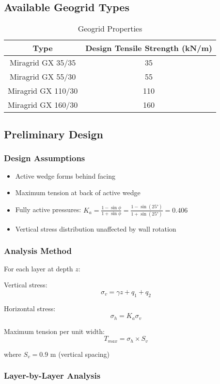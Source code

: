 \documentclass[10pt,a4paper,twocolumn]{article}
\begin{document}
\subsection{Available Geogrid Types}
\begin{table}[H]
\centering
\caption{Geogrid Properties}
\begin{tabular}{|c|c|}
\hline
\textbf{Type} & \textbf{Design Tensile Strength (kN/m)} \\
\hline
Miragrid GX 35/35 & 35 \\
Miragrid GX 55/30 & 55 \\
Miragrid GX 110/30 & 110 \\
Miragrid GX 160/30 & 160 \\
\hline
\end{tabular}
\end{table}

\subsection{Preliminary Design}

\subsubsection{Design Assumptions}
\begin{itemize}
\item Active wedge forms behind facing
\item Maximum tension at back of active wedge
\item Fully active pressures: $K_a = \frac{1-\sin\phi}{1+\sin\phi} = \frac{1-\sin(25°)}{1+\sin(25°)} = 0.406$
\item Vertical stress distribution unaffected by wall rotation
\end{itemize}

\subsubsection{Analysis Method}


For each layer at depth $z$:

Vertical stress:
$$\sigma_v = \gamma z + q_1 + q_2$$

Horizontal stress:
$$\sigma_h = K_a \sigma_v$$

Maximum tension per unit width:
$$T_{max} = \sigma_h \times S_v$$

where $S_v = 0.9$ m (vertical spacing)

\subsubsection{Layer-by-Layer Analysis}
\end{document}
